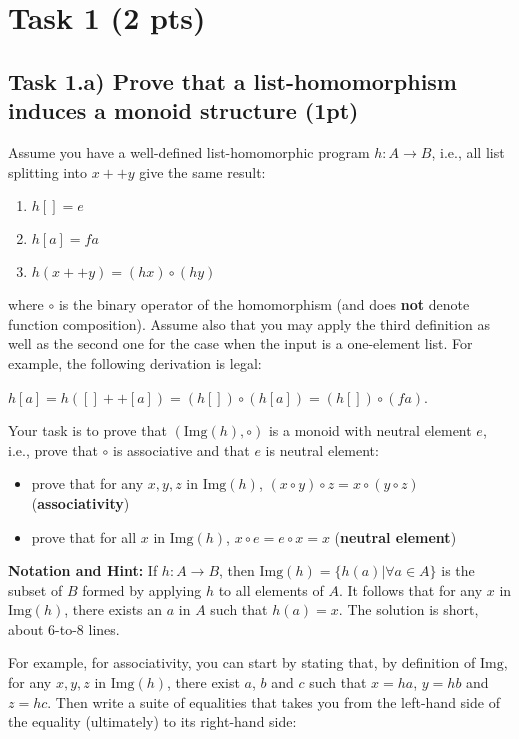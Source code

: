 \documentclass{article}
\begin{document}
\section{Task 1 (2 pts)}

\subsection{Task 1.a) Prove that a list-homomorphism induces a monoid structure (1pt)}

Assume you have a well-defined list-homomorphic program $h : A \to B$, i.e., all list splitting into $x++y$ give the same result:

\begin{enumerate}
    \item $h [] = e$
    \item $h [a] = f a$
    \item $h (x ++ y) = (h x) \circ (h y)$
\end{enumerate}

where $\circ$ is the binary operator of the homomorphism (and does \textbf{not} denote function composition). Assume also that you may apply the third definition as well as the second one for the case when the input is a one-element list. For example, the following derivation is legal:

$h [a] = h ([] ++ [a]) = (h []) \circ (h [a]) = (h []) \circ (f a)$. 

Your task is to prove that $( \text{Img}(h), \circ )$ is a monoid with neutral element $e$, i.e., prove that $\circ$ is associative and that $e$ is neutral element:

\begin{itemize}
    \item prove that for any $x, y, z$ in $\text{Img}(h)$, $(x \circ y) \circ z = x \circ (y \circ z)$ (\textbf{associativity})
    \item prove that for all $x$ in $\text{Img}(h)$, $x \circ e = e \circ x = x$ (\textbf{neutral element})
\end{itemize}

\textbf{Notation and Hint:} If $h : A \to B$, then $\text{Img}(h) = \{ h(a) | \forall a \in A \}$ is the subset of $B$ formed by applying $h$ to all elements of $A$.  It follows that for any $x$ in $\text{Img}(h)$, there exists an $a$ in $A$ such that $h(a) = x$.  The solution is short, about 6-to-8 lines.

For example, for associativity, you can start by stating that, by definition of $\text{Img}$, for any $x, y, z$ in $\text{Img}(h)$, there exist $a$, $b$ and $c$ such that $x = h a$, $y = h b$ and $z = h c$. Then write a suite of equalities that takes you from the left-hand side of the equality (ultimately)  to its right-hand side:
\end{document}
